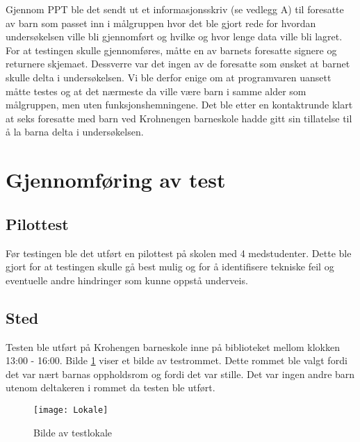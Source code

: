 Gjennom PPT ble det sendt ut et informasjonsskriv (se vedlegg A) til foresatte av barn som passet inn i målgruppen hvor det ble gjort rede for hvordan undersøkelsen ville bli gjennomført og hvilke og hvor lenge data ville bli lagret. For at testingen skulle gjennomføres, måtte en av barnets foresatte signere og returnere skjemaet. Dessverre var det ingen av de foresatte som ønsket at barnet skulle delta i undersøkelsen. Vi ble derfor enige om at programvaren uansett måtte testes og at det nærmeste da ville være barn i samme alder som målgruppen, men uten funksjonshemningene.  Det ble etter en kontaktrunde klart at seks foresatte med barn ved Krohnengen barneskole hadde gitt sin tillatelse til å la barna delta i undersøkelsen. 
 
 
\section{Gjennomføring av test} 
 
 
\subsection{Pilottest} 
 
Før testingen ble det utført en pilottest på skolen med 4 medstudenter. Dette ble gjort for at testingen skulle gå best mulig og for å identifisere tekniske feil og eventuelle andre hindringer som kunne oppstå underveis.  
 
 
\subsection{Sted} 
Testen ble utført på Krohengen barneskole inne på biblioteket mellom klokken 13:00 - 
16:00. Bilde \ref{fig:test_lokale} viser et bilde av testrommet. Dette rommet ble valgt fordi det var nært barnas oppholdsrom og fordi det var 
stille. Det var ingen andre barn utenom deltakeren i rommet da testen ble utført. 

 
 
\begin{figure}[ht!] 
\centering 
\texttt{[image: Lokale]} 
\caption{Bilde av testlokale} 
\label{fig:test_lokale} 
\end{figure} 
 
 

